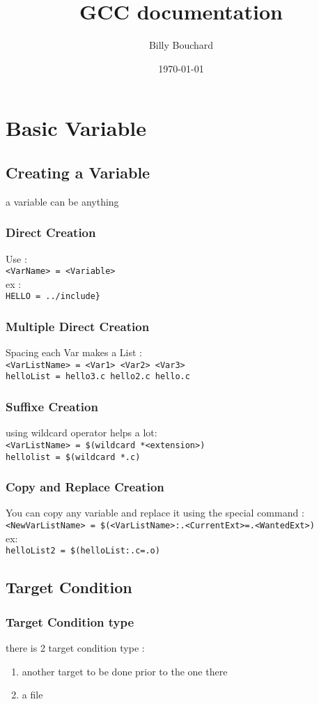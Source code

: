 \documentclass[12pt]{article}
\author{Billy Bouchard}
\title{GCC documentation}
\date{\today}
\begin{document}
\maketitle
\tableofcontents
\newpage
\section{Basic Variable}
\subsection{Creating a Variable}
a variable can be anything
\subsubsection{Direct Creation}
Use : \\
\verb|<VarName> = <Variable>|\\
ex : \\
\verb|HELLO = ../include}|

\subsubsection{Multiple Direct Creation}
Spacing each Var makes a List : \\
\verb|<VarListName> = <Var1> <Var2> <Var3>| \\
\verb|helloList = hello3.c hello2.c hello.c |

\subsubsection{Suffixe Creation}
using wildcard operator helps a lot:\\
\verb|<VarListName> = $(wildcard *<extension>)| \\
\verb|hellolist = $(wildcard *.c)|

\subsubsection{Copy and Replace Creation}
You can copy any variable and replace it using the special command :
\verb|<NewVarListName> = $(<VarListName>:.<CurrentExt>=.<WantedExt>)|\\
ex: \\
\verb|helloList2 = $(helloList:.c=.o)|
\newpage
\subsection{Target Condition}
\subsubsection{Target Condition type}
there is 2 target condition type :
\begin{enumerate}
  \item another target to be done prior to the one there
  \item a file
\end{enumerate}
\end{document}
